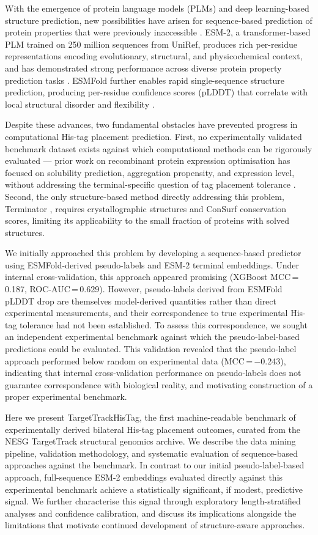 \documentclass[unnumsec,webpdf,contemporary,large]{oup-authoring-template}
\begin{document}
With the emergence of protein language models (PLMs) and deep learning-based structure prediction, new possibilities have arisen for sequence-based prediction of protein properties that were previously inaccessible \citep{rives2021,lin2023}. ESM-2, a transformer-based PLM trained on 250 million sequences from UniRef, produces rich per-residue representations encoding evolutionary, structural, and physicochemical context, and has demonstrated strong performance across diverse protein property prediction tasks \citep{lin2023}. ESMFold further enables rapid single-sequence structure prediction, producing per-residue confidence scores (pLDDT) that correlate with local structural disorder and flexibility \citep{jumper2021}.

Despite these advances, two fundamental obstacles have prevented progress in computational His-tag placement prediction. First, no experimentally validated benchmark dataset exists against which computational methods can be rigorously evaluated --- prior work on recombinant protein expression optimisation has focused on solubility prediction, aggregation propensity, and expression level, without addressing the terminal-specific question of tag placement tolerance \citep{hebditch2017,sormanni2015,kuriata2019}. Second, the only structure-based method directly addressing this problem, Terminator \citep{gerulskis2025}, requires crystallographic structures and ConSurf conservation scores, limiting its applicability to the small fraction of proteins with solved structures.

We initially approached this problem by developing a sequence-based predictor using ESMFold-derived pseudo-labels and ESM-2 terminal embeddings. Under internal cross-validation, this approach appeared promising (XGBoost MCC\,=\,0.187, ROC-AUC\,=\,0.629). However, pseudo-labels derived from ESMFold pLDDT drop are themselves model-derived quantities rather than direct experimental measurements, and their correspondence to true experimental His-tag tolerance had not been established. To assess this correspondence, we sought an independent experimental benchmark against which the pseudo-label-based predictions could be evaluated. This validation revealed that the pseudo-label approach performed below random on experimental data (MCC\,=\,$-$0.243), indicating that internal cross-validation performance on pseudo-labels does not guarantee correspondence with biological reality, and motivating construction of a proper experimental benchmark.

Here we present TargetTrackHisTag, the first machine-readable benchmark of experimentally derived bilateral His-tag placement outcomes, curated from the NESG TargetTrack structural genomics archive. We describe the data mining pipeline, validation methodology, and systematic evaluation of sequence-based approaches against the benchmark. In contrast to our initial pseudo-label-based approach, full-sequence ESM-2 embeddings evaluated directly against this experimental benchmark achieve a statistically significant, if modest, predictive signal. We further characterise this signal through exploratory length-stratified analyses and confidence calibration, and discuss its implications alongside the limitations that motivate continued development of structure-aware approaches.
\end{document}
